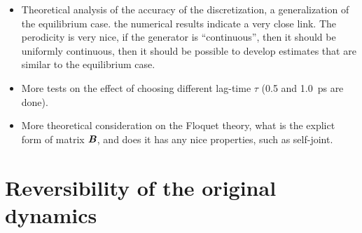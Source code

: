 \documentclass[preprint,unsortedaddress,a4paper,onecolumn]{revtex4-1}
\newcommand{\vect}[1]{\textbf{\textit{#1}}}
\begin{document}
\begin{itemize}
\item Theoretical analysis of the accuracy of the discretization, a
generalization of the equilibrium case. the numerical results indicate
a very close link. The perodicity is very nice, if the generator is
``continuous'', then it should be uniformly continuous, then it should
be possible to develop estimates that are similar to the equilibrium
case.
\item More tests on the effect of choosing different lag-time $\tau$ (0.5 and 1.0~ps are done).
\item More theoretical consideration on the Floquet theory, what is the
explict form of matrix $\vect B$, and does it has any nice properties,
such as self-joint.
\end{itemize}


\section{Reversibility of the original dynamics}
\end{document}
